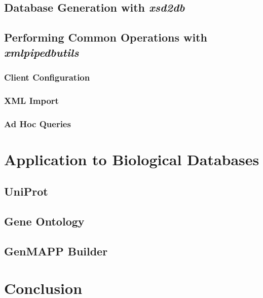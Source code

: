 \documentclass[11pt]{article}
\begin{document}
\subsection{Database Generation with \emph{xsd2db}}

\subsection{Performing Common Operations with \emph{xmlpipedbutils}}

\subsubsection{Client Configuration}

\subsubsection{XML Import}

\subsubsection{Ad Hoc Queries}

\section{Application to Biological Databases}

\subsection{UniProt}

\subsection{Gene Ontology}

\subsection{GenMAPP Builder}

\section{Conclusion}



\end{document}
